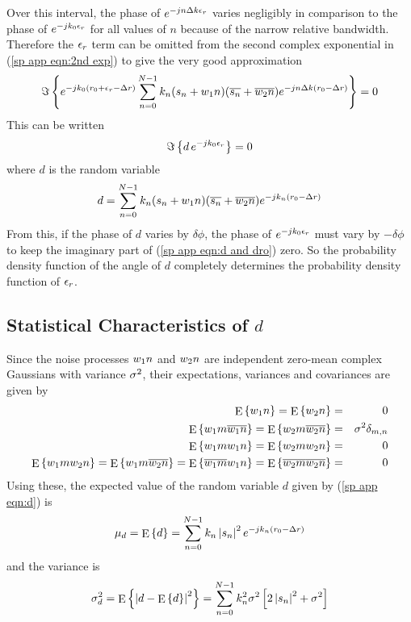 Over this interval, the phase of ${e^{-jn{\Delta k}\epsilon_r}}$ varies 
negligibly in comparison to the phase of ${e^{-jk_0\epsilon_r}}$
for all values of $n$ because of the narrow relative bandwidth.
Therefore the $\epsilon_r$ term can be omitted from the second complex
exponential in (\ref{sp app eqn:2nd exp}) to give the very good approximation
\begin{equation}
\Im\left\{{e^{-jk_0({r_0}+\epsilon_r-{\Delta r})}}\sum_{n=0}^{N-1} k_n(s_n+{w_1}{n})
(\overline{s_n}+\overline{{w_2}{n}}){e^{-jn{\Delta k}({r_0}-{\Delta r})}}\right\}=0
\end{equation}
This can be written
\begin{equation}\label{sp app eqn:d and dro}
\Im\left\{d\,{e^{-jk_0\epsilon_r}}\right\}=0
\end{equation}
where $d$ is the random variable
\begin{equation}\label{sp app eqn:d}
d=\sum_{n=0}^{N-1} k_n(s_n+{w_1}{n})(\overline{s_n}+\overline{{w_2}{n}})
{e^{-jk_n({r_0}-{\Delta r})}}
\end{equation}
From this, if the phase of $d$ varies by $\delta\phi$, the phase of
${e^{-jk_0\epsilon_r}}$ must vary by $-\delta\phi$ to keep the imaginary part of
(\ref{sp app eqn:d and dro}) zero.  So the probability density function of the
angle of $d$ completely determines the probability density function of
$\epsilon_r$.


\subsection{Statistical Characteristics of $d$}

Since the noise processes ${w_1}{n}$ and ${w_2}{n}$ are independent zero-mean
complex Gaussians with variance ${\sigma^2}$, their expectations, variances and 
covariances are given by
\begin{eqnarray}
{\mathop{\rm E}\nolimits\left\{{w_1}{n}\right\}}={\mathop{\rm E}\nolimits\left\{{w_2}{n}\right\}}&=&0 {\nonumber} \\
{\mathop{\rm E}\nolimits\left\{{w_1}{m}\overline{{w_1}{n}}\right\}}={\mathop{\rm E}\nolimits\left\{{w_2}{m}\overline{{w_2}{n}}\right\}}&=&{\sigma^2}\delta_{m,n}{\nonumber} \\
{\mathop{\rm E}\nolimits\left\{{w_1}{m}{w_1}{n}\right\}}={\mathop{\rm E}\nolimits\left\{{w_2}{m}{w_2}{n}\right\}}&=&0{\nonumber} \\
{\mathop{\rm E}\nolimits\left\{{w_1}{m}{w_2}{n}\right\}}={\mathop{\rm E}\nolimits\left\{{w_1}{m}\overline{{w_2}{n}}\right\}}=
  {\mathop{\rm E}\nolimits\left\{\overline{{w_1}{m}}{w_1}{n}\right\}}={\mathop{\rm E}\nolimits\left\{\overline{{w_2}{m}}\overline{{w_2}{n}}\right\}}&=&0
\end{eqnarray}
Using these, the expected value of the random variable $d$ given by
(\ref{sp app eqn:d}) is
\begin{equation}
\mu_d={\mathop{\rm E}\nolimits\left\{d\right\}}=\sum_{n=0}^{N-1} k_n\left|s_n\right|^2{e^{-jk_n({r_0}-{\Delta r})}}
\end{equation}
and the variance is
\begin{equation}
\sigma_d^2={\mathop{\rm E}\nolimits\left\{\left|d-{\mathop{\rm E}\nolimits\left\{d\right\}}\right|^2\right\}}=\sum_{n=0}^{N-1} k_n^2 {\sigma^2} \left[
2\left|s_n\right|^2 +{\sigma^2}\right]
\end{equation}

